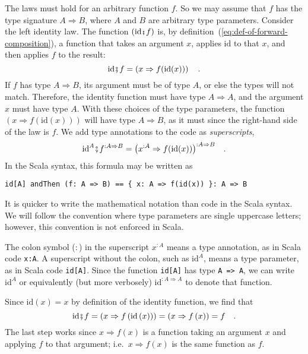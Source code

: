 The laws must hold for an arbitrary function $f$. So we may assume
that $f$ has the type signature $A\Rightarrow B$, where $A$ and
$B$ are arbitrary type parameters. Consider the left identity law.
The function $\left(\text{id}\bef f\right)$ is, by definition~(\ref{eq:def-of-forward-composition}),
a function that takes an argument $x$, applies $\text{id}$ to that
$x$, and then applies $f$ to the result: 
\[
\text{id}\bef f=\left(x\Rightarrow f(\text{id}(x))\right)\quad.
\]
If $f$ has type $A\Rightarrow B$, its argument must be of type $A$,
or else the types will not match. Therefore, the identity function
must have type $A\Rightarrow A$, and the argument $x$ must have
type $A$. With these choices of the type parameters, the function
$\left(x\Rightarrow f(\text{id}(x))\right)$ will have type $A\Rightarrow B$,
as it must since the right-hand side of the law is $f$. We add type
annotations to the code as \emph{superscripts},
\[
\text{id}^{A}\bef f^{:A\Rightarrow B}=\big(x^{:A}\Rightarrow f(\text{id}(x))\big)^{:A\Rightarrow B}\quad.
\]
In the Scala syntax, this formula may be written as
\begin{lstlisting}
id[A] andThen (f: A => B) == { x: A => f(id(x)) }: A => B
\end{lstlisting}
It is quicker to write the mathematical notation than code in the
Scala syntax. We will follow the convention where type parameters
are single uppercase letters; however, this convention is not enforced
in Scala.

The colon symbol ($:$) in the superscript $x^{:A}$ means a type
annotation, as in Scala code \lstinline!x:A!.
A superscript without the colon, such as $\text{id}^{A}$, means a
type parameter, as in Scala code \lstinline!id[A]!.
Since the function \lstinline!id[A]!
has type \lstinline!A => A!,
we can write $\text{id}^{A}$ or equivalently (but more verbosely)
$\text{id}^{:A\Rightarrow A}$ to denote that function.

Since $\text{id}(x)=x$ by definition of the identity function, we
find that 
\[
\text{id}\bef f=\left(x\Rightarrow f\left(\text{id}\left(x\right)\right)\right)=\left(x\Rightarrow f\left(x\right)\right)=f\quad.
\]
The last step works since $x\Rightarrow f\left(x\right)$ is a function
taking an argument $x$ and applying $f$ to that argument; i.e.~$x\Rightarrow f\left(x\right)$
is the same function as $f$.

